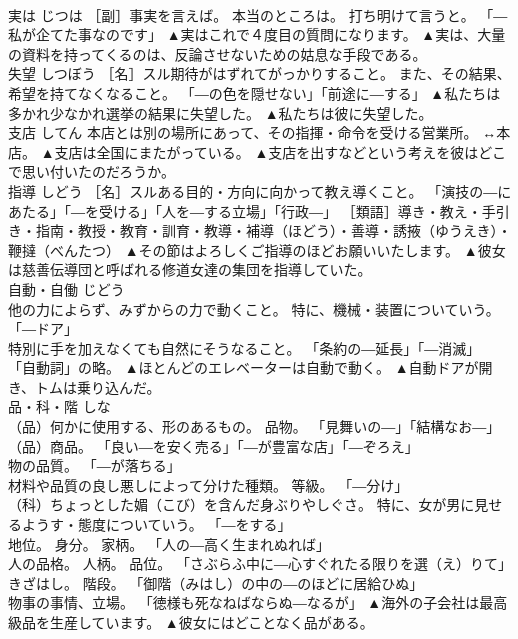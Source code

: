 \documentclass[8pt]{extreport}
\begin{document}
\begin{CJK}{UTF8}{min}
\\	実は	じつは	［副］事実を言えば。 本当のところは。 打ち明けて言うと。 「―私が企てた事なのです」	▲実はこれで４度目の質問になります。 ▲実は、大量の資料を持ってくるのは、反論させないための姑息な手段である。
\\	失望	しつぼう	［名］スル期待がはずれてがっかりすること。 また、その結果、希望を持てなくなること。 「―の色を隠せない」「前途に―する」	▲私たちは多かれ少なかれ選挙の結果に失望した。 ▲私たちは彼に失望した。
\\	支店	してん	本店とは別の場所にあって、その指揮・命令を受ける営業所。 ↔本店。	▲支店は全国にまたがっている。 ▲支店を出すなどという考えを彼はどこで思い付いたのだろうか。
\\	指導	しどう	［名］スルある目的・方向に向かって教え導くこと。 「演技の―にあたる」「―を受ける」「人を―する立場」「行政―」 ［類語］導き・教え・手引き・指南・教授・教育・訓育・教導・補導（ほどう）・善導・誘掖（ゆうえき）・鞭撻（べんたつ）	▲その節はよろしくご指導のほどお願いいたします。 ▲彼女は慈善伝導団と呼ばれる修道女達の集団を指導していた。
\\	自動・自働	じどう	
\\	他の力によらず、みずからの力で動くこと。 特に、機械・装置についていう。 「―ドア」 
\\	特別に手を加えなくても自然にそうなること。 「条約の―延長」「―消滅」 
\\	「自動詞」の略。	▲ほとんどのエレベーターは自動で動く。 ▲自動ドアが開き、トムは乗り込んだ。
\\	品・科・階	しな	
\\	（品）何かに使用する、形のあるもの。 品物。 「見舞いの―」「結構なお―」 
\\	（品）商品。 「良い―を安く売る」「―が豊富な店」「―ぞろえ」 
\\	物の品質。 「―が落ちる」 
\\	材料や品質の良し悪しによって分けた種類。 等級。 「―分け」 
\\	（科）ちょっとした媚（こび）を含んだ身ぶりやしぐさ。 特に、女が男に見せるようす・態度についていう。 「―をする」 
\\	地位。 身分。 家柄。 「人の―高く生まれぬれば」 
\\	人の品格。 人柄。 品位。 「さぶらふ中に―心すぐれたる限りを選（え）りて」 
\\	きざはし。 階段。 「御階（みはし）の中の―のほどに居給ひぬ」 
\\	物事の事情、立場。 「徳様も死なねばならぬ―なるが」	▲海外の子会社は最高級品を生産しています。 ▲彼女にはどことなく品がある。

\end{CJK}
\end{document}
